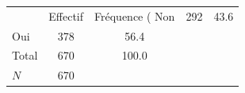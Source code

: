 {
\def\sym#1{\ifmmode^{#1}\else\(^{#1}\)\fi}
\begin{tabular}{l*{1}{cc}}
\toprule
            &    Effectif&Fréquence (%
\midrule
Non         &         292&        43.6\\
Oui         &         378&        56.4\\
Total       &         670&       100.0\\
\midrule
\(N\)       &         670&            \\
\bottomrule
\end{tabular}
}
